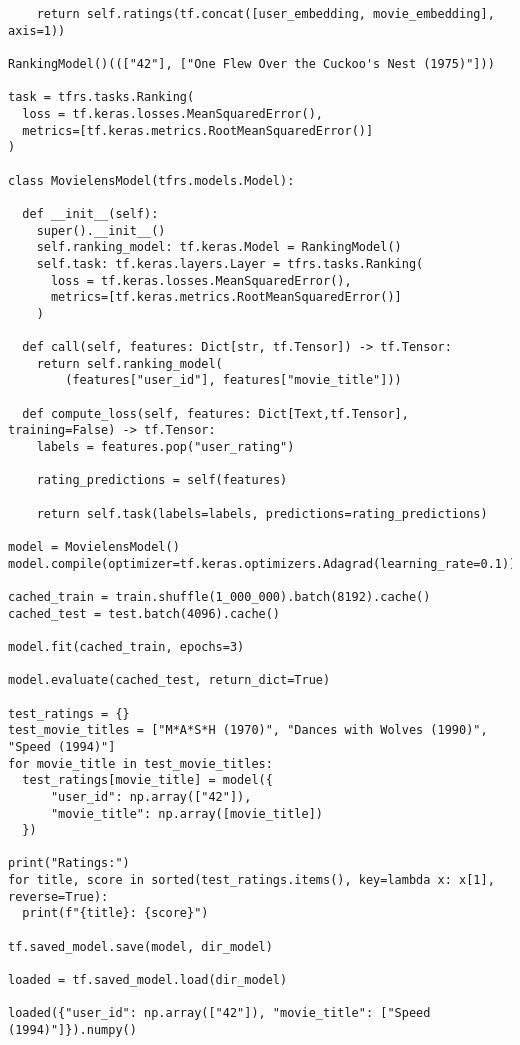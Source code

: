 \begin{verbatim}
    return self.ratings(tf.concat([user_embedding, movie_embedding], axis=1))

RankingModel()((["42"], ["One Flew Over the Cuckoo's Nest (1975)"]))

task = tfrs.tasks.Ranking(
  loss = tf.keras.losses.MeanSquaredError(),
  metrics=[tf.keras.metrics.RootMeanSquaredError()]
)

class MovielensModel(tfrs.models.Model):

  def __init__(self):
    super().__init__()
    self.ranking_model: tf.keras.Model = RankingModel()
    self.task: tf.keras.layers.Layer = tfrs.tasks.Ranking(
      loss = tf.keras.losses.MeanSquaredError(),
      metrics=[tf.keras.metrics.RootMeanSquaredError()]
    )

  def call(self, features: Dict[str, tf.Tensor]) -> tf.Tensor:
    return self.ranking_model(
        (features["user_id"], features["movie_title"]))

  def compute_loss(self, features: Dict[Text,tf.Tensor], training=False) -> tf.Tensor:
    labels = features.pop("user_rating")

    rating_predictions = self(features)

    return self.task(labels=labels, predictions=rating_predictions)

model = MovielensModel()
model.compile(optimizer=tf.keras.optimizers.Adagrad(learning_rate=0.1))

cached_train = train.shuffle(1_000_000).batch(8192).cache()
cached_test = test.batch(4096).cache()

model.fit(cached_train, epochs=3)

model.evaluate(cached_test, return_dict=True)

test_ratings = {}
test_movie_titles = ["M*A*S*H (1970)", "Dances with Wolves (1990)", "Speed (1994)"]
for movie_title in test_movie_titles:
  test_ratings[movie_title] = model({
      "user_id": np.array(["42"]),
      "movie_title": np.array([movie_title])
  })

print("Ratings:")
for title, score in sorted(test_ratings.items(), key=lambda x: x[1], reverse=True):
  print(f"{title}: {score}")

tf.saved_model.save(model, dir_model)

loaded = tf.saved_model.load(dir_model)

loaded({"user_id": np.array(["42"]), "movie_title": ["Speed (1994)"]}).numpy()
\end{verbatim}

